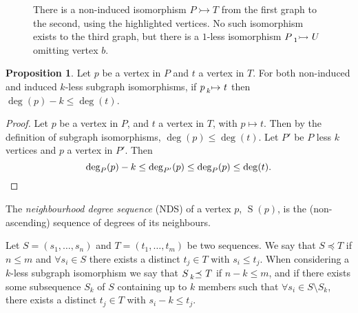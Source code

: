 \documentclass[letterpaper]{article}
\theoremstyle{definition}
\newtheorem{proposition}{Proposition}
\newcommand{\lessnonind}[1]{\prescript{}{#1}{\rightarrowtail}\ }
\newcommand{\lessmap}[1]{\prescript{}{#1}{\mapsto}\ }
\newcommand{\lesspreceq}[1]{\prescript{}{#1}{\preceq}\ }
\newcommand{\nds}{\operatorname{S}}
\begin{document}
\begin{figure}[t]
    \caption{There is a non-induced isomorphism $P\rightarrowtail T$ from the first graph to the
    second, using the highlighted vertices. No such isomorphism exists to the third graph, but there
    is a $1$-less isomorphism $P\lessnonind{1} U$ omitting vertex $b$.}\label{figure:klessexample}
\end{figure}

\begin{proposition}\label{prop:deg}
    Let $p$ be a vertex in $P$ and $t$ a vertex in $T$. For both non-induced and induced
    $k$-less subgraph isomorphisms, if $p \lessmap{k} t$ then
    $\deg(p) - k \le \deg(t)$.
\end{proposition}
\begin{proof}
Let $p$ be a vertex in $P$, and $t$ a vertex in $T$, with $p\mapsto t$. Then by the definition of subgraph isomorphisms, $\deg(p) \le \deg(t)$. Let $P'$ be $P$ less $k$ vertices and $p$ a vertex in $P'$. Then
\[
\deg_{P}(p)-k \le \deg_{P'}(p) \le \deg_{P}(p) \le \deg(t). \qedhere
\]
\end{proof}

The \emph{neighbourhood degree sequence} (NDS) of a vertex $p$, $\nds(p)$, is the (non-ascending)
sequence of degrees of its neighbours.

Let $S = ( s_1 , \ldots , s_n )$ and $T = ( t_1 , \ldots , t_m)$ be two sequences.  We say that $S
\preceq T$ if $n \leq m$ and $\forall s_i \in S$ there exists a distinct $t_j \in T$ with $s_i \leq
t_j$.  When considering a $k$-less subgraph isomorphism we say that $S \lesspreceq{k} T$ if $n - k
\leq m$, and if there exists some subsequence $S_k$ of $S$ containing up to $k$ members such that
$\forall s_i \in S \setminus S_k$, there exists a distinct $t_j \in T$ with $s_i - k \leq t_j$.
\end{document}
